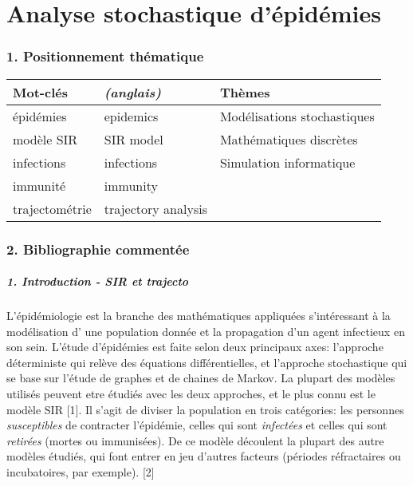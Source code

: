 \documentclass{article}
\begin{document}
\part*{Analyse stochastique d'épidémies}

\section*{1. Positionnement thématique}

\begin{tabular}{ | l | l | l | }
 Mot-clés        &  \textit{(anglais)}          &  Thèmes                              \\
\hline

 épidémies       &  epidemics            &  Modélisations stochastiques         \\

 modèle SIR      &  SIR model            &  Mathématiques discrètes \\

 infections      &  infections           &  Simulation informatique             \\

 immunité        &  immunity             &                                      \\

 trajectométrie  &  trajectory analysis  &                                      \\

\end{tabular}

\section*{2. Bibliographie commentée}

\subsubsection*{1. Introduction - SIR et trajecto}

L'épidémiologie est la branche des mathématiques appliquées s'intéressant à la modélisation d' une population donnée et la propagation d'un agent infectieux en son sein. L'étude d'épidémies est faite selon deux principaux axes: l'approche déterministe qui relève des équations différentielles, et l'approche stochastique qui se base sur l'étude de graphes et de chaines de Markov. La plupart des modèles utilisés peuvent etre étudiés avec les deux approches, et le plus connu est le modèle SIR [1]. Il s'agit de diviser la population en trois catégories: les personnes \textit{susceptibles} de contracter l'épidémie, celles qui sont \textit{infectées} et celles qui sont \textit{retirées} (mortes ou immunisées). De ce modèle découlent la plupart des autre modèles étudiés, qui font entrer en jeu d'autres facteurs (périodes réfractaires ou incubatoires, par exemple). [2]
\end{document}
